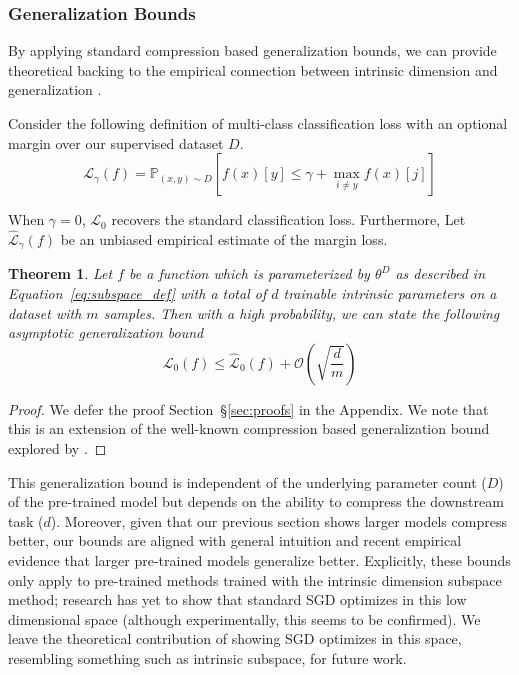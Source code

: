 \documentclass{article} %
\newtheorem{theorem}{Theorem}
\begin{document}
\subsubsection{Generalization Bounds}
By applying standard compression based generalization bounds, we can provide theoretical backing to the empirical connection between intrinsic dimension and generalization \citep{compression_generalization_gap}.

Consider the following definition of multi-class classification loss with an optional margin over our supervised dataset $D$. 
\begin{equation}
    \mathcal{L}_{\gamma}(f) = \mathbb{P}_{(x,y)\sim D}\left[f(x)[y] \le \gamma + \max_{i \ne y} f(x)[j] \right]
\end{equation}

When $\gamma = 0$, $\mathcal{L}_0$ recovers the standard classification loss. Furthermore, Let $\hat{\mathcal{L}}_{\gamma}(f)$ be an unbiased empirical estimate of the margin loss. 
\begin{theorem}
Let $f$ be a function which is parameterized by $\theta^D$ as described in Equation~\ref{eq:subspace_def} with a total of $d$ trainable intrinsic parameters on a dataset with $m$ samples. Then with a high probability, we can state the following asymptotic generalization bound
\begin{equation}
    \mathcal{L}_{0}(f) \leq \hat{\mathcal{L}}_{0}(f) + \mathcal{O}\left(\sqrt{\frac{d}{m}}\right)
\end{equation}
\end{theorem}
\begin{proof}
We defer the proof Section~\S\ref{sec:proofs} in the Appendix. We note that this is an extension of the well-known compression based generalization bound explored by \cite{compression_generalization_gap}.  
\end{proof}

This generalization bound is independent of the underlying parameter count ($D$) of the pre-trained model but depends on the ability to compress the downstream task ($d$). Moreover, given that our previous section shows larger models compress better, our bounds are aligned with general intuition and recent empirical evidence that larger pre-trained models generalize better. Explicitly, these bounds only apply to pre-trained methods trained with the intrinsic dimension subspace method; research has yet to show that standard SGD optimizes in this low dimensional space (although experimentally, this seems to be confirmed). We leave the theoretical contribution of showing SGD optimizes in this space, resembling something such as intrinsic subspace, for future work.
\end{document}
